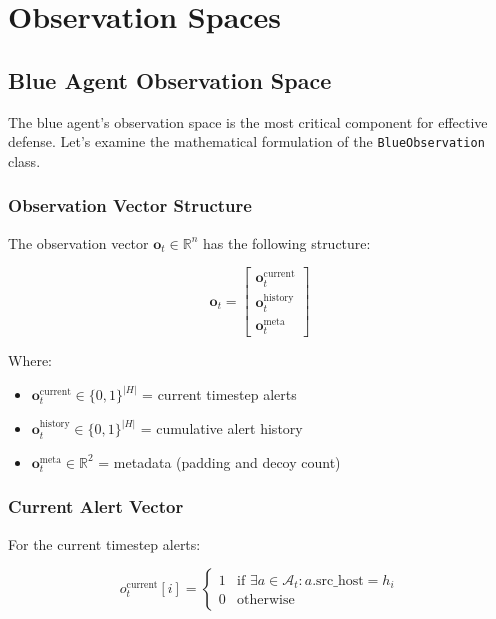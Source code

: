 \documentclass[12pt,a4paper]{article}
\begin{document}
\section{Observation Spaces}

\subsection{Blue Agent Observation Space}

The blue agent's observation space is the most critical component for effective defense. Let's examine the mathematical formulation of the \texttt{BlueObservation} class.

\subsubsection{Observation Vector Structure}
The observation vector $\mathbf{o}_t \in \mathbb{R}^n$ has the following structure:

\begin{equation}
\mathbf{o}_t = \begin{bmatrix}
\mathbf{o}_t^{\text{current}} \\
\mathbf{o}_t^{\text{history}} \\
\mathbf{o}_t^{\text{meta}}
\end{bmatrix}
\end{equation}

Where:
\begin{itemize}
    \item $\mathbf{o}_t^{\text{current}} \in \{0,1\}^{|H|}$ = current timestep alerts
    \item $\mathbf{o}_t^{\text{history}} \in \{0,1\}^{|H|}$ = cumulative alert history
    \item $\mathbf{o}_t^{\text{meta}} \in \mathbb{R}^2$ = metadata (padding and decoy count)
\end{itemize}

\subsubsection{Current Alert Vector}
For the current timestep alerts:

\begin{equation}
o_t^{\text{current}}[i] = \begin{cases}
1 & \text{if } \exists a \in \mathcal{A}_t : a.\text{src\_host} = h_i \\
0 & \text{otherwise}
\end{cases}
\end{equation}
\end{document}
